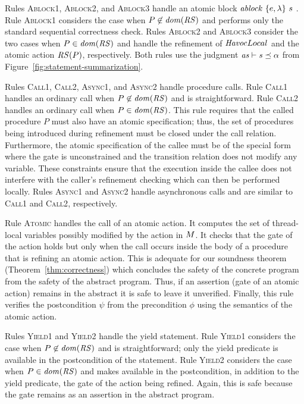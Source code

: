 Rules \textsc{Ablock1}, \textsc{Ablock2}, and \textsc{Ablock3} handle an atomic block $\mathit{ablock}\ {\{e,\lambda\}}\ {s}\ $.
Rule \textsc{Ablock1} considers the case when $P \not \in \mathit{dom}(\mathit{RS})$ and performs only the 
standard sequential correctness check.
Rules \textsc{Ablock2} and \textsc{Ablock3} consider the two cases when $P \in \mathit{dom}(\mathit{RS})$ and handle
the refinement of $\mathit{Havoc}{Local}$ and the atomic action $\mathit{RS}(P)$, respectively.
Both rules use the judgment $\mathit{as} \vdash \mathit{s} \preceq \alpha$ from Figure~\ref{fig:statement-summarization}.

Rules \textsc{Call1}, \textsc{Call2}, \textsc{Async1}, and \textsc{Async2} handle procedure calls.
Rule \textsc{Call1} handles an ordinary call when $P \not \in \mathit{dom}(\mathit{RS})$ and is straightforward.
Rule \textsc{Call2} handles an ordinary call when $P \in \mathit{dom}(\mathit{RS})$.
This rule requires that the called procedure $P$ must also have an atomic specification;
thus, the set of procedures being introduced during refinement must be closed under the call relation.
Furthermore, the atomic specification of the callee must be of the special form
where the gate is unconstrained and the transition relation does not modify any variable.
These constraints ensure that the execution inside the callee does not interfere with the caller's refinement checking 
which can then be performed locally.
Rules \textsc{Async1} and \textsc{Async2} handle asynchronous calls and are similar to \textsc{Call1} and \textsc{Call2}, respectively.

Rule \textsc{Atomic} handles the call of an atomic action.
It computes the set of thread-local variables possibly modified by the action in $M$.
It checks that the gate of the action holds but only when the call occurs inside the body of a procedure 
that is refining an atomic action.
This is adequate for our soundness theorem (Theorem~\ref{thm:correctness}) which concludes the safety of the concrete 
program from the safety of the abstract program.
Thus, if an assertion (gate of an atomic action) remains in the abstract it is safe to leave it unverified.
Finally, this rule verifies the postcondition $\psi$ from the precondition $\phi$ using the semantics of the atomic action.

Rules \textsc{Yield1} and \textsc{Yield2} handle the yield statement.
Rule \textsc{Yield1} considers the case when $P \not \in \mathit{dom}(\mathit{RS})$ and is straightforward;
only the yield predicate is available in the postcondition of the statement.
Rule \textsc{Yield2} considers the case when $P \in \mathit{dom}(\mathit{RS})$ and makes available in the postcondition, in 
addition to the yield predicate, the gate of the action being refined.
Again, this is safe because the gate remains as an assertion in the abstract program.

